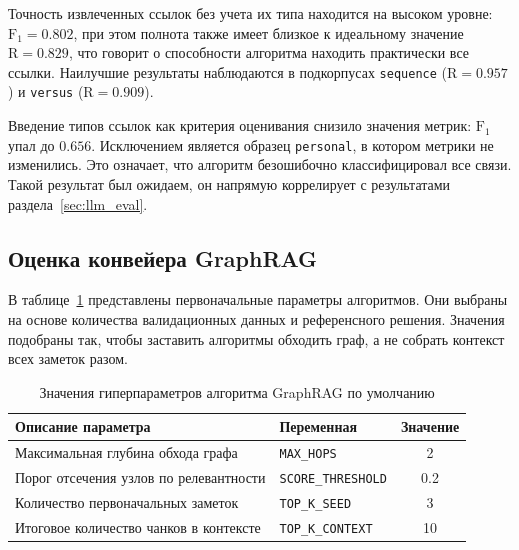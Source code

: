 Точность извлеченных ссылок без учета их типа находится на высоком уровне:
$\text{F}_1 = 0.802$, при этом полнота также имеет близкое к идеальному значение
$\text{R} = 0.829$, что говорит о способности алгоритма находить
практически все ссылки.
Наилучшие результаты наблюдаются в подкорпусах
\texttt{sequence} ($\text{R} = 0.957$) и \texttt{versus} ($\text{R} = 0.909$).

Введение типов ссылок как критерия оценивания
снизило значения метрик: $\text{F}_1$ упал до $0.656$.
Исключением является образец \texttt{personal}, в котором метрики не изменились.
Это означает, что алгоритм безошибочно классифицировал все связи.
Такой результат был ожидаем, он напрямую коррелирует с результатами раздела~\ref{sec:llm_eval}.

\subsection{Оценка конвейера GraphRAG}
\label{sec:graphrag_eval}

В таблице~\ref{tab:graphrag_default_params} представлены первоначальные параметры алгоритмов.
Они выбраны на основе количества валидационных данных и референсного решения.
Значения подобраны так, чтобы заставить алгоритмы обходить граф,
а не собрать контекст всех заметок разом.

\begin{table}[H]
    \caption{Значения гиперпараметров алгоритма GraphRAG по умолчанию}
    \label{tab:graphrag_default_params}
    \centering
    \renewcommand{\arraystretch}{1.0}
    \begin{tabularx}{\textwidth}{|>{\raggedright\arraybackslash}X|l|c|}
        \hline
        \textbf{Описание параметра}            & \textbf{Переменная}       & \textbf{Значение} \\
        \hline
        Максимальная глубина обхода графа      & \texttt{MAX\_HOPS}        & 2                 \\
        \hline
        Порог отсечения узлов по релевантности & \texttt{SCORE\_THRESHOLD} & 0.2               \\
        \hline
        Количество первоначальных заметок      & \texttt{TOP\_K\_SEED}     & 3                 \\
        \hline
        Итоговое количество чанков в контексте & \texttt{TOP\_K\_CONTEXT}  & 10                \\
        \hline
    \end{tabularx}
\end{table}

